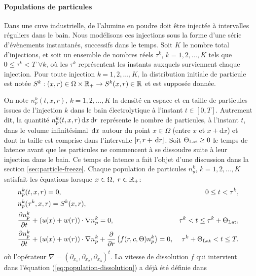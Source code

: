 \paragraph{Populations de particules}
Dans une cuve industrielle, de l'alumine en poudre doit être injectée
à intervalles réguliers dans le bain. Nous modélisons ces injections
sous la forme d'une série d'évènements instantanés, successifs dans le
temps. Soit $K$ le nombre total d'injections, et soit un ensemble de
nombres réels $\tau^k$, $k = 1, 2, \dots, K$ tels que $0\leq \tau^k <
T$ $\forall k$, où les $\tau^k$ représentent les instants auxquels
surviennent chaque injection. Pour toute injection $k = 1,2, \dots,
K$, la distribution initiale de particule est notée $S^k:(x,
r)\in\Omega\times\mathbb R_+\to S^k(x, r)\in\mathbb R$ et est supposée
donnée.

On note $n_p^k(t, x, r)$, $k = 1, 2, \dots, K$ la densité en espace et
en taille de particules issues de l'injection $k$ dans le bain
électrolytique à l'instant $t \in [0, T]$. Autrement dit, la quantité
$n_p^k(t, x, r)\,\mathrm dx\,\mathrm dr$ représente le nombre de particules, à
l'instant $t$, dans le volume infinitésimal $\,\mathrm dx$ autour du point
$x\in\Omega$ (entre $x$ et $x + \mathrm dx$) et dont la taille est comprise dans l'intervalle $[r,
  r+\,\mathrm dr]$. Soit $\Theta_\text{Lat} \geq 0$ le temps de latence avant que les
particules ne commencent à se dissoudre suite à leur injection dans le
bain. Ce temps de latence a fait l'objet d'une discussion dans la
section \ref{sec:particle-freeze}. Chaque population de particules
$n_p^k$, $k = 1, 2,\dots, K$ satisfait les
équations lorsque $x\in\Omega,\ r\in\rplus$:
\begin{align}
  &n_p^k(t, x, r) = 0, & 0\leq t < \tau^k,\label{eq:population-pre-injection}\\
  &n_p^k(\tau^k, x, r) = S^k(x, r),\label{eq:population-injection}\\
  &\frac{\partial n_p^k}{\partial t} + (u(x) + w(r))\cdot \nabla n_p^k
  = 0, &\tau^k < t \leq \tau^k +
  \Theta_\text{Lat},\label{eq:population-transport}\\
  &\frac{\partial n_p^k}{\partial t} + (u(x) + w(r))\cdot \nabla n_p^k
  + \frac{\partial}{\partial r} \left( f(r, c,
    \Theta) n_p^k \right) = 0, &\tau^k + \Theta_\text{Lat} < t \leq T.\label{eq:population-dissolution}
\end{align}
où l'opérateur $\nabla = (\partial_{x_1}, \partial_{x_2},
\partial_{x_3})^t$. La vitesse de dissolution $f$ qui intervient dans
l'équation (\ref{eq:population-dissolution}) a déjà été définie dans
